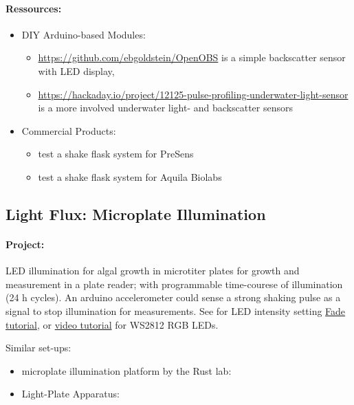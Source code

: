 \documentclass[12pt,a4paper]{scrartcl}
\begin{document}
\paragraph{Ressources:}
\begin{itemize}
  \setlength\itemsep{0em}
\item DIY Arduino-based Modules:
  \begin{itemize}
    \setlength\itemsep{-1em}
  \item \url{https://github.com/ebgoldstein/OpenOBS} is a simple
    backscatter sensor with LED display, 
  \item \url{https://hackaday.io/project/12125-pulse-profiling-underwater-light-sensor}
    is a more involved underwater light- and backscatter sensors
  \end{itemize}
\item Commercial Products:
  \begin{itemize}
    \setlength\itemsep{-1em}
  \item \cite{Ude2014} test a shake flask system for PreSens
  \item \cite{Bruder2016} test a shake flask system for Aquila Biolabs
  \end{itemize}
\end{itemize}

\clearpage
\subsection{Light Flux: Microplate Illumination} 
\label{led}

\paragraph{Project:} LED illumination for algal growth in microtiter plates for
growth and measurement in a plate reader; with programmable
time-courese of illumination (24 h cycles). An arduino accelerometer
could sense a strong shaking pulse as a signal to stop illumination
for measurements. See for LED intensity setting \href{
  https://www.arduino.cc/en/Tutorial/Fade}{Fade tutorial}, or
\href{https://www.youtube.com/watch?v=PNQ8R1Ptvs4}{video tutorial} for
WS2812 RGB LEDs.

Similar set-ups:
\begin{itemize}
\item microplate illumination platform by the Rust lab: \cite{Lambert2016,Leypunskiy2017} 
\item Light-Plate Apparatus: \cite{Gerhardt2016}
\end{itemize}
\end{document}
